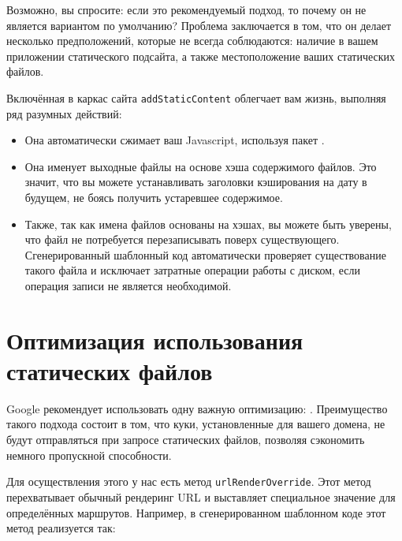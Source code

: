 \begin{remark}
    Возможно, вы спросите: если это рекомендуемый подход, то почему он не
    является вариантом по умолчанию? Проблема заключается в том, что он делает
    несколько предположений, которые не всегда соблюдаются: наличие в вашем
    приложении статического подсайта, а также местоположение ваших статических
    файлов.
\end{remark}

Включённая в каркас сайта \lstinline!addStaticContent! облегчает вам жизнь,
выполняя ряд разумных действий:
\begin{itemize}
  \item Она автоматически сжимает ваш Javascript, используя пакет
      .

  \item Она именует выходные файлы на основе хэша содержимого файлов. Это
      значит, что вы можете устанавливать заголовки кэширования на дату в
      будущем, не боясь получить устаревшее содержимое.

  \item Также, так как имена файлов основаны на хэшах, вы можете быть уверены,
      что файл не потребуется перезаписывать поверх существующего.
      Сгенерированный шаблонный код автоматически проверяет существование
      такого файла и исключает затратные операции работы с диском, если
      операция записи не является необходимой.
\end{itemize}

\section {Оптимизация использования статических файлов}

Google рекомендует использовать одну важную оптимизацию:
.
Преимущество такого подхода состоит в том, что куки, установленные для вашего
домена, не будут отправляться при запросе статических файлов, позволяя
сэкономить немного пропускной способности.

Для осуществления этого у нас есть метод \lstinline!urlRenderOverride!. Этот
метод перехватывает обычный рендеринг URL и выставляет специальное значение для
определённых маршрутов. Например, в сгенерированном шаблонном коде этот метод
реализуется так:

